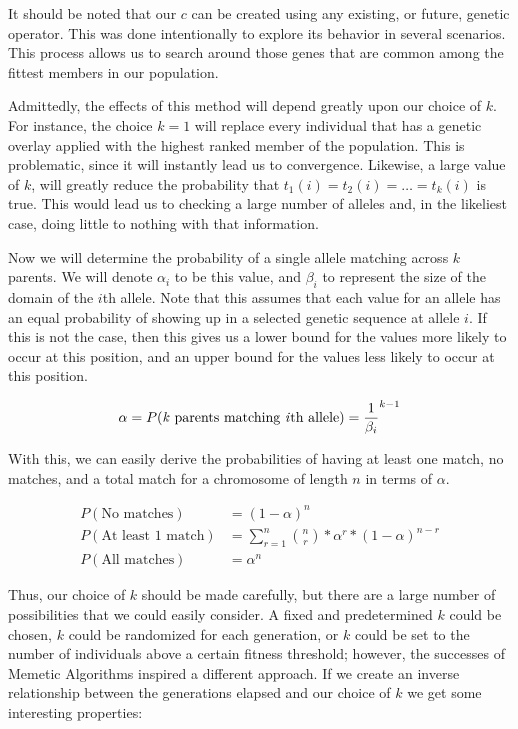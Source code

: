 It should be noted that our $c$ can be created using any existing, or future, genetic operator. This was done intentionally to explore its behavior in several scenarios. This process allows us to search around those genes that are common among the fittest members in our population. 

Admittedly, the effects of this method will depend greatly upon our choice of $k$. For instance, the choice $k = 1$ will replace every individual that has a genetic overlay applied with the highest ranked member of the population. This is problematic, since it will instantly lead us to convergence. Likewise, a large value of $k$, will greatly reduce the probability that $t_1(i) = t_2(i) = \ldots = t_k(i)$ is true. This would lead us to checking a large number of alleles and, in the likeliest case, doing little to nothing with that information.

Now we will determine the probability of a single allele matching across $k$ parents. We will denote $\alpha_i$ to be this value, and $\beta_i$ to represent the size of the domain of the $i$th allele. Note that this assumes that each value for an allele has an equal probability of showing up in a selected genetic sequence at allele $i$. If this is not the case, then this gives us a lower bound for the values more likely to occur at this position, and an upper bound for the values less likely to occur at this position.

\[ \alpha = P(\text{\emph{k} parents matching \emph{i}th allele}) = \frac{1}{\beta_i}^{k-1} \]

With this, we can easily derive the probabilities of having at least one match, no matches, and a total match for a chromosome of length $n$ in terms of $\alpha$.

\begin{align*}
P( \text{No matches})&= (1 - \alpha)^n \\
P( \text{At least 1 match}) &=\sum\limits^{n}_{r=1} \binom{n}{r}*\alpha^{r}*(1-\alpha)^{n-r} \\
P( \text{All matches})&= \alpha^n
\end{align*}

Thus, our choice of $k$ should be made carefully, but there are a large number of possibilities that we could easily consider. A fixed and predetermined $k$ could be chosen, $k$ could be randomized for each generation, or $k$ could be set to the number of individuals above a certain fitness threshold; however, the successes of Memetic Algorithms inspired a different approach. If we create an inverse relationship between the generations elapsed and our choice of $k$ we get some interesting properties:

